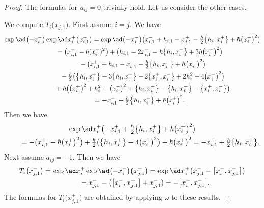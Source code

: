 \begin{proof}The formulas for $a_{ij}=0$ trivially hold. Let us consider the other cases.

We compute $T_i\big(x_{j,1}^-\big)$. First assume $i=j$. We have
\begin{gather*}
\exp\ad \big({-}x_i^-\big)\exp\ad x_i^+\big(x_{i,1}^-\big) = \exp\ad \big({-}x_i^-\big)\big(x_{i,1}^- + h_{i,1}-x_{i,1}^+ -\tfrac{\hbar}{2}\big\{ h_i, x_i^+\big\} + \hbar \big(x_i^+\big)^2\big)\\
\qquad {}= \big(x_{i,1}^- - \hbar(x_i^-)^2\big)+\big(h_{i,1}-2x_{i,1}^- - \hbar\big\{ h_i, x_i^- \big\} + 3\hbar \big(x_i^-\big)^2\big)\\
\qquad\quad{}-\big(x_{i,1}^+ + h_{i,1}-x_{i,1}^--\tfrac{\hbar}{2}\big\{ h_i, x_i^-\big\} + \hbar \big(x_i^-\big)^2\big)\\
\qquad\quad{}-\tfrac{\hbar}{2}\big(\big\{h_i,x_i^+\big\} - 3\big\{h_i,x_i^-\big\} - 2\big\{x_i^+,x_i^-\big\} + 2h_i^2 + 4\big(x_i^-\big)^2\big)\\
\qquad\quad{} +\hbar\big(\big(x_i^+\big)^2 + h_i^2 + \big(x_i^-\big)^2+ \big\{h_i,x_i^+\big\} - \big\{h_i,x_i^-\big\} - \big\{x_i^+,x_i^-\big\}\big)\\
\qquad{}=-x_{i,1}^+ + \tfrac{\hbar}{2}\big\{h_i,x_i^+\big\} +\hbar \big(x_i^+\big)^2.
\end{gather*}
Then we have
\begin{gather*}
\exp\ad x_i^+\big({-}x_{i,1}^+ + \tfrac{\hbar}{2}\big\{h_i,x_i^+\big\} +\hbar \big(x_i^+\big)^2\big) \\
\qquad {}= -\big( x_{i,1}^+-\hbar \big(x_i^+\big)^2 \big) + \tfrac{\hbar}{2}\big( \big\{h_i,x_i^+\big\} - 4\big(x_i^+\big)^2 \big) + \hbar \big(x_i^+\big)^2
 =-x_{i,1}^++\tfrac{\hbar}{2}\big\{h_i,x_i^+\big\}.
\end{gather*}
Next assume $a_{ij}=-1$. Then we have
\begin{gather*}
T_i\big(x_{j,1}^-\big)=\exp\ad x_i^+\exp\ad \big({-}x_i^-\big)\big(x_{j,1}^-\big) = \exp\ad x_i^+\big(x_{j,1}^- - \big[x_i^-,x_{j,1}^-\big]\big)\\
\hphantom{T_i\big(x_{j,1}^-\big)}{} = x_{j,1}^- - \big(\big[x_i^-,x_{j,1}^-\big]+x_{j,1}^-)=-\big[x_i^-,x_{j,1}^-\big]. %
\end{gather*}
The formulas for $T_i\big(x_{j,1}^+\big)$ are obtained by applying $\omega$ to these results.


\end{proof}
